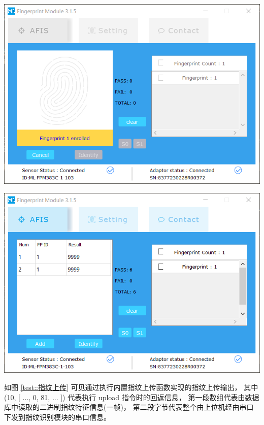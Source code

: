     \noindent
    \begin{minipage}[t]{0.48\linewidth}
            \label{fig::注册指纹}
        \includegraphics[width=\textwidth]{./imgs/注册指纹.png}
    \end{minipage}
    \begin{minipage}[t]{0.48\linewidth}
            \label{test::指纹上传后查询与匹配}
        \includegraphics[width=\textwidth]{./imgs/测试-指纹上传后查询与匹配.png}
    \end{minipage}

    如图 \ref{test::指纹上传} 可见通过执行内置指纹上传函数实现的指纹上传输出，
    其中 (10, [ ..., 0, 81, ... ]) 代表执行 upload 指令时的回返信息，
    第一段数组代表由数据库中读取的二进制指纹特征信息(一帧)，
    第二段字节代表整个由上位机经由串口下发到指纹识别模块的串口信息。

